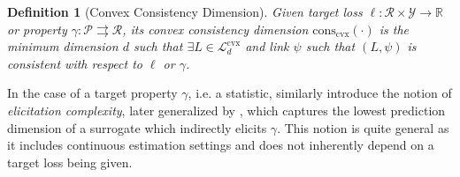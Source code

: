 \documentclass[11pt]{article} %
\newcommand{\Comments}{1}
\newcommand{\mytodo}[2]{\ifnum\Comments=1%
	\todo[linecolor=#1!80!black,backgroundcolor=#1,bordercolor=#1!80!black]{#2}\fi}
\newcommand{\raft}[1]{\mytodo{green!20!white}{RF: #1}}
\newcommand{\jessiet}[1]{\mytodo{purple!20!white}{JF: #1}}
\newcommand{\btw}[1]{}%
\newcommand{\reals}{\mathbb{R}}
\newcommand{\conscvx}{\mathrm{cons}_\mathrm{cvx}}
\newcommand{\ccdim}{\mathrm{cc\,dim}}
\newcommand{\Lcvx}{\mathcal{L}^{\mathrm{cvx}}}
\newcommand{\R}{\mathcal{R}}
\renewcommand{\P}{\mathcal{P}}
\newcommand{\Y}{\mathcal{Y}}
\newcommand{\toto}{\rightrightarrows}
\newtheorem{definition}{Definition}
\begin{document}


\begin{definition}[Convex Consistency Dimension]\label{def:cvx-consistency-dim}
  Given target loss $\ell:\R \times\Y \to \reals$ or property $\gamma: \P \toto \R$, its \emph{convex consistency dimension} $\conscvx(\cdot)$ is the minimum dimension $d$ such that $\exists L \in \Lcvx_d$ and link $\psi$ such that $(L,\psi)$ is consistent with respect to $\ell$ or $\gamma$.
\end{definition}

In the case of a target property $\gamma$, i.e. a statistic, \citet{lambert2008eliciting} similarly introduce the notion of \emph{elicitation complexity}, later generalized by \citet{frongillo2020elicitation}, which captures the lowest prediction dimension of a surrogate which indirectly elicits $\gamma$.
This notion is quite general as it includes continuous estimation settings and does not inherently depend on a target loss being given. 
\end{document}
